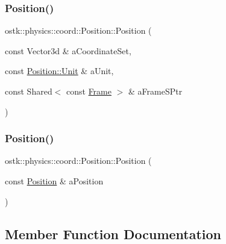 \subsubsection{\texorpdfstring{Position()}{Position()}\hspace{0.1cm}{\footnotesize\ttfamily [1/2]}}
{\footnotesize\ttfamily ostk\+::physics\+::coord\+::\+Position\+::\+Position (\begin{DoxyParamCaption}\item[{const Vector3d \&}]{a\+Coordinate\+Set,  }\item[{const \hyperlink{classostk_1_1physics_1_1units_1_1_length_a2664470a7eedf5d45c88861fe69badea}{Position\+::\+Unit} \&}]{a\+Unit,  }\item[{const Shared$<$ const \hyperlink{classostk_1_1physics_1_1coord_1_1_frame}{Frame} $>$ \&}]{a\+Frame\+S\+Ptr }\end{DoxyParamCaption})}

\mbox{\label{classostk_1_1physics_1_1coord_1_1_position_a3de0cc8c3a8478760298fa63f1c23e5f}} 
\subsubsection{\texorpdfstring{Position()}{Position()}\hspace{0.1cm}{\footnotesize\ttfamily [2/2]}}
{\footnotesize\ttfamily ostk\+::physics\+::coord\+::\+Position\+::\+Position (\begin{DoxyParamCaption}\item[{const \hyperlink{classostk_1_1physics_1_1coord_1_1_position}{Position} \&}]{a\+Position }\end{DoxyParamCaption})}



\subsection{Member Function Documentation}
\mbox{\label{classostk_1_1physics_1_1coord_1_1_position_a47594258eb1f13649f3ba705a9a3d1e8}} 
